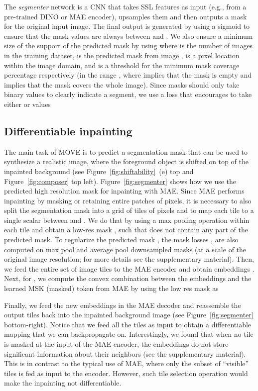 \documentclass{article}
\newcommand\methodname{MOVE\xspace}
\begin{document}
The \emph{segmenter} network is a CNN that takes SSL features as input (e.g., from a pre-trained DINO or MAE encoder), upsamples them and then outputs a mask for the original input image. The final output is generated by using a sigmoid to ensure that the mask values are always between  and . We also ensure a minimum
size of the support of the predicted mask by using 
where  is the number of images in the training dataset,  is the predicted mask from image ,  is a pixel location within the image domain, and  is a threshold for the minimum
mask coverage percentage respectively (in the range , where  implies that the mask is empty and  implies that the mask covers the whole image). 
Since masks should only take binary values to clearly indicate a segment, we use a loss that encourages  to take either  or  values



\subsection{Differentiable inpainting}
The main task of \methodname is to predict a segmentation mask that can be used to synthesize a realistic image, where the foreground object is shifted on top of the inpainted background (see Figure~\ref{fig:shiftability}~(e) top and Figure~\ref{fig:composer} top left). 
Figure~\ref{fig:segmenter} shows how we use the predicted high resolution mask for inpainting with MAE. Since MAE performs inpainting by masking or retaining entire patches of  pixels, it is necessary to also split the segmentation mask into a grid of tiles of  pixels and to map each tile to a single scalar between  and . We do that by using a max pooling operation within each tile and obtain a low-res mask , such that  does not contain any part of the predicted mask.
To regularize the predicted mask , the mask losses ,
 are also computed on max pool  and average pool downsampled masks (at a scale  of the original image resolution; for more details see the supplementary material).
Then, we feed the entire set of image tiles to the MAE encoder and obtain embeddings . 
Next, for , we compute the convex combination between the embeddings  and the learned MSK (masked) token from MAE by using the low res mask  as 

Finally, we feed the new embeddings  in the MAE decoder and reassemble the output tiles back into the inpainted background image  (see Figure~\ref{fig:segmenter} bottom-right).
Notice that we feed all the tiles as input to obtain a differentiable mapping that we can backpropagate on. Interestingly, we found that when no tile is masked at the input of the MAE encoder, the embeddings  do not store significant information about their neighbors (see the supplementary material). This is in contrast to the typical use of MAE, where only the subset of ``visible'' tiles is fed as input to the encoder. However, such tile selection operation would make the inpainting not differentiable.
\end{document}
